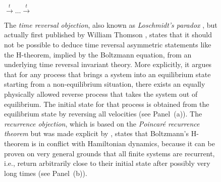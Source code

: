 \documentclass[a4paper,12pt,listof=totoc,index=totoc,bibliography=totoc,headsepline=false,headings=normal,BCOR16.153846mm,DIV12,headinclude,twoside,cleardoublepage=empty,numbers=noenddot,final]{scrreprt}
\theoremstyle{mystyle}
\numberwithin{equation}{section}
\numberwithin{figure}{section}
\numberwithin{lemma}{section}
\numberwithin{theorem}{section}
\numberwithin{corollary}{section}
\numberwithin{definition}{section}
\numberwithin{conjecture}{section}
\numberwithin{observation}{section}
\newcommand{\+}{\mkern2mu}
\DeclareMathOperator{\1}{\mathds{1}}
\begin{document}
\begin{figure}[bt]
\begin{itemize}
\begin{center}
      $\overset{t}{\longrightarrow} \dots \overset{t}{\longrightarrow}$
    \end{center}
  \end{itemize}
  \caption{The \emph{time reversal objection}, also known as \emph{Loschmidt's paradox} \cite{Loschmidt1877}, but actually first published by William Thomson \cite{ThomsonLordKelvin1874}, states that it should not be possible to deduce time reversal asymmetric statements like the H-theorem, implied by the Boltzmann equation, from an underlying time reversal invariant theory. More explicitly, it argues that for any process that brings a system into an equilibrium state starting from a non-equilibrium situation, there exists an equally physically allowed reverse process that takes the system out of equilibrium. The initial state for that process is obtained from the equilibrium state by reversing all velocities (see Panel~(a)).
The \emph{recurrence objection}, which is based on the \emph{Poincaré recurrence theorem} but was made explicit by \textcite{Zermelo1896}, states that Boltzmann's H-theorem is in conflict with Hamiltonian dynamics, because it can be proven on very general grounds that all finite systems are recurrent, i.e., return arbitrarily close to their initial state after possibly very long times (see Panel~(b)).}
  \label{fig:timereversalandrecurrenceobjection}
\end{figure}
\end{document}
